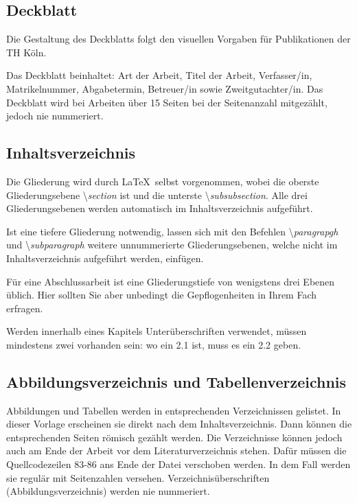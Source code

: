 \documentclass[a4paper,11pt]{article}%
\renewcommand{\\}{\vspace*{0.5\baselineskip} \newline}
\begin{document}
\subsection{Deckblatt}	

Die Gestaltung des Deckblatts folgt den visuellen Vorgaben für Publikationen der TH Köln.\\

Das Deckblatt beinhaltet: Art der Arbeit, Titel der Arbeit, Verfasser/in, Matrikelnummer, Abgabetermin, Betreuer/in sowie Zweitgutachter/in. Das Deckblatt wird bei Arbeiten über 15 Seiten bei der Seitenanzahl mitgezählt, jedoch nie nummeriert.



\subsection{Inhaltsverzeichnis}

Die Gliederung wird durch \LaTeX~selbst vorgenommen, wobei die oberste Gliederungsebene \textbackslash\textit{section} ist und die unterste \textbackslash\textit{subsubsection}. Alle drei Gliederungsebenen werden automatisch im Inhaltsverzeichnis aufgeführt. \\

Ist eine tiefere Gliederung notwendig, lassen sich mit den Befehlen \textbackslash\textit{paragrapgh} und \textbackslash\textit{subparagraph} weitere unnummerierte Gliederungsebenen, welche nicht im Inhaltsverzeichnis aufgeführt werden, einfügen.\\

Für eine Abschlussarbeit ist eine Gliederungstiefe von wenigstens drei Ebenen üblich. Hier sollten Sie aber unbedingt die Gepflogenheiten in Ihrem Fach erfragen.\\

Werden innerhalb eines Kapitels Unterüberschriften verwendet, müssen mindestens zwei vorhanden sein: wo ein 2.1 ist, muss es ein 2.2 geben.



\subsection{Abbildungsverzeichnis und Tabellenverzeichnis}

Abbildungen und Tabellen werden in entsprechenden Verzeichnissen gelistet. In dieser Vorlage erscheinen sie direkt nach dem Inhaltsverzeichnis. Dann können die entsprechenden Seiten römisch gezählt werden. Die Verzeichnisse können jedoch auch am Ende der Arbeit vor dem Literaturverzeichnis stehen. Dafür müssen die Quellcodezeilen 83-86 ans Ende der Datei verschoben werden. In dem Fall werden sie regulär mit Seitenzahlen versehen. Verzeichnisüberschriften (Abbildungsverzeichnis) werden nie nummeriert. \\
\end{document}
